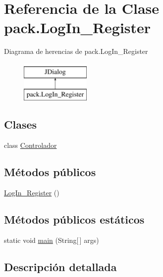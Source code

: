 \hypertarget{classpack_1_1_log_in___register}{}\section{Referencia de la Clase pack.\+Log\+In\+\_\+\+Register}
\label{classpack_1_1_log_in___register}
Diagrama de herencias de pack.\+Log\+In\+\_\+\+Register\begin{figure}[H]
\begin{center}
\leavevmode
\includegraphics[height=2.000000cm]{classpack_1_1_log_in___register}
\end{center}
\end{figure}
\subsection*{Clases}
\begin{DoxyCompactItemize}
\item 
class \mbox{\hyperlink{classpack_1_1_log_in___register_1_1_controlador}{Controlador}}
\end{DoxyCompactItemize}
\subsection*{Métodos públicos}
\begin{DoxyCompactItemize}
\item 
\mbox{\hyperlink{classpack_1_1_log_in___register_a70dc784075ce952609f2bd5b6ef924dc}{Log\+In\+\_\+\+Register}} ()
\end{DoxyCompactItemize}
\subsection*{Métodos públicos estáticos}
\begin{DoxyCompactItemize}
\item 
static void \mbox{\hyperlink{classpack_1_1_log_in___register_ae63739c76a49164c4ff4e7bc0caec8d4}{main}} (String\mbox{[}$\,$\mbox{]} args)
\end{DoxyCompactItemize}


\subsection{Descripción detallada}


